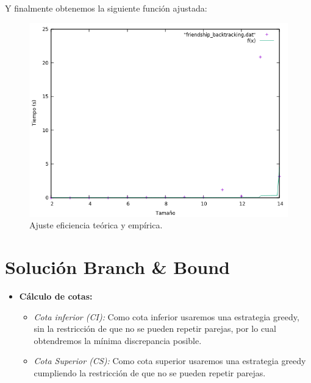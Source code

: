 Y finalmente obtenemos la siguiente función ajustada:
\begin{figure}[H]
    \begin{center}
        \includegraphics[scale=0.7]{imagenes/btadj.png}
        \caption{Ajuste eficiencia teórica y empírica.}
        \label{fig20}
    \end{center}
\end{figure}


\section{Solución Branch \& Bound}

\begin{itemize}
    \item \textbf{Cálculo de cotas:}
    \begin{itemize}
        \item \textit{Cota inferior (CI):} Como cota inferior usaremos una estrategia greedy, sin la restricción de que no se pueden repetir parejas, por lo cual obtendremos la mínima discrepancia posible.
        \item \textit{Cota Superior (CS):} Como cota superior usaremos una estrategia greedy cumpliendo la restricción de que no se pueden repetir parejas.
    \end{itemize}
\end{itemize}

